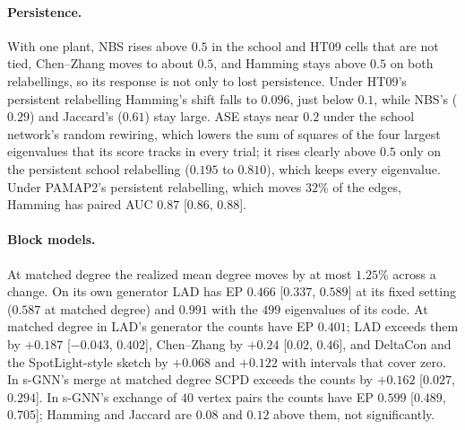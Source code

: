 \documentclass[11pt]{article}
\theoremstyle{dsplain}
\theoremstyle{definition}
\begin{document}
\paragraph{Persistence.} With one plant, NBS rises above $0.5$ in the school and HT09 cells that are not tied,
Chen--Zhang moves to about $0.5$, and Hamming stays above $0.5$ on both relabellings, so its response is not
only to lost persistence. Under HT09's persistent relabelling Hamming's shift falls to $0.096$, just below
$0.1$, while NBS's ($0.29$) and Jaccard's ($0.61$) stay large. ASE stays near $0.2$ under the school network's random rewiring, which lowers the sum
of squares of the four largest eigenvalues that its score tracks in every trial; it rises clearly above
$0.5$ only on the persistent school relabelling ($0.195$ to $0.810$), which keeps every eigenvalue. Under PAMAP2's
persistent relabelling, which moves $32\%$ of the edges, Hamming
has paired AUC $0.87$ [$0.86$, $0.88$].

\paragraph{Block models.} At matched degree the realized mean degree moves by at most $1.25\%$ across a
change. On its own generator LAD has EP $0.466$ [$0.337$, $0.589$] at its fixed setting ($0.587$ at matched degree) and
$0.991$ with the $499$ eigenvalues of its code. At matched degree in LAD's generator the counts have EP
$0.401$; LAD exceeds them by $+0.187$ [$-0.043$, $0.402$], Chen--Zhang by $+0.24$ [$0.02$, $0.46$], and
DeltaCon and the SpotLight-style sketch by $+0.068$ and $+0.122$ with intervals that cover zero. In s-GNN's
merge at matched degree SCPD exceeds the counts by $+0.162$ [$0.027$, $0.294$]. In s-GNN's exchange of $40$ vertex pairs the counts have EP $0.599$ [$0.489$, $0.705$]; Hamming and
Jaccard are $0.08$ and $0.12$ above them, not significantly.
\end{document}

